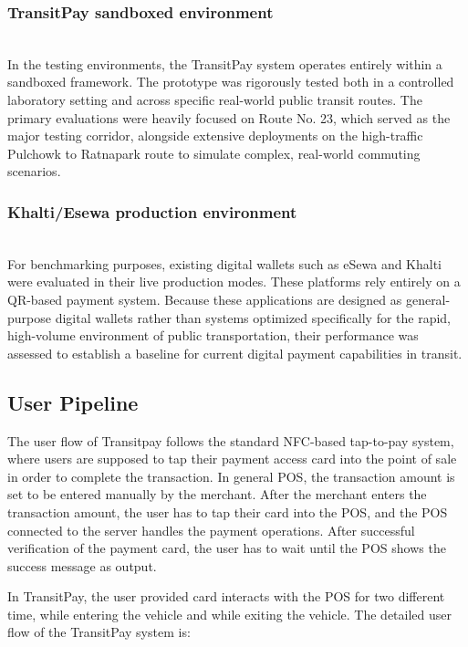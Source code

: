 \documentclass[sigconf, nonacm]{acmart}
\begin{document}
\subsubsection{TransitPay sandboxed environment} \mbox{} \\
In the testing environments, the TransitPay system operates entirely within a sandboxed framework. The prototype was rigorously tested both in a controlled laboratory setting and across specific real-world public transit routes. The primary evaluations were heavily focused on Route No. 23, which served as the major testing corridor, alongside extensive deployments on the high-traffic Pulchowk to Ratnapark route to simulate complex, real-world commuting scenarios.

\subsubsection{Khalti/Esewa production environment} \mbox{} \\
For benchmarking purposes, existing digital wallets such as eSewa and Khalti were evaluated in their live production modes. These platforms rely entirely on a QR-based payment system. Because these applications are designed as general-purpose digital wallets rather than systems optimized specifically for the rapid, high-volume environment of public transportation, their performance was assessed to establish a baseline for current digital payment capabilities in transit.




\subsection{User Pipeline}
The user flow of Transitpay follows the standard NFC-based tap-to-pay system, where users are supposed to tap their payment access card into the point of sale in order to complete the transaction. In general POS, the transaction amount is set to be entered manually by the merchant. After the merchant enters the transaction amount, the user has to tap their card into the POS, and the POS connected to the server handles the payment operations. After successful verification of the payment card, the user has to wait until the POS shows the success message as output.

In TransitPay, the user provided card interacts with the POS for two different time, while entering the vehicle and while exiting the vehicle. The detailed user flow of the TransitPay system is:
\end{document}
